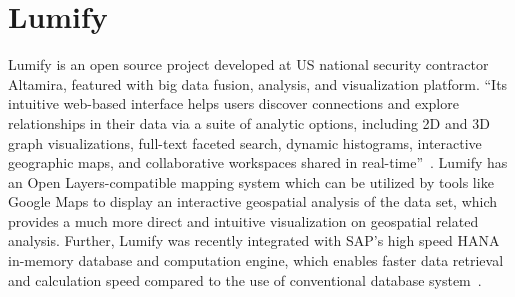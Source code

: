 \section{Lumify}
Lumify is an open source project developed at US national security contractor Altamira, featured with 
big data fusion, analysis, and visualization platform. ``Its intuitive web-based interface helps users 
discover connections and explore relationships in their data via a suite of analytic options, including 2D 
and 3D graph visualizations, full-text faceted search, dynamic histograms, interactive geographic 
maps, and collaborative workspaces shared in real-time''~\cite{hid-sp18-405-www-lumify}. Lumify has 
an Open Layers-compatible mapping system which can be utilized by tools like Google Maps to display 
an interactive geospatial analysis of the data set, which provides a much more direct and intuitive 
visualization on geospatial related analysis. Further, Lumify was recently integrated with SAP's high 
speed HANA in-memory database and computation engine, which enables faster data retrieval and 
calculation speed compared to the use of conventional database 
system~\cite{hid-sp18-405-linkedinblog-lumify}. 
